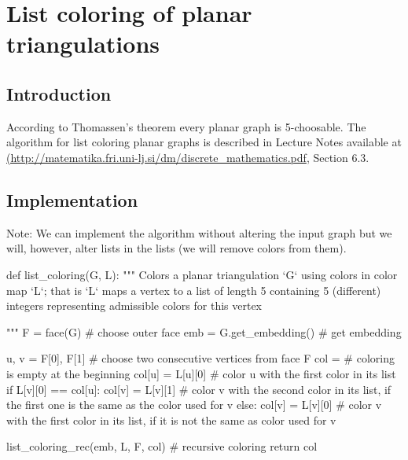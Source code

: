 \chapter{List coloring of planar triangulations}

\section{Introduction}

According to Thomassen's theorem every planar graph is 5-choosable. The algorithm for list coloring planar graphs is described in Lecture Notes available at \url{(http://matematika.fri.uni-lj.si/dm/discrete_mathematics.pdf}, Section 6.3.

\section{Implementation}

Note: We can implement the algorithm without altering the input graph but we will, however, alter lists in the lists (we will remove colors from them).

\begin{sageCell}
def list_coloring(G, L):
    """
    Colors a planar triangulation `G` using colors in color map `L`; that is `L` maps a vertex to a list of length 5 containing
    5 (different) integers representing admissible colors for this vertex

    """
    F = face(G)  # choose outer face
    emb = G.get_embedding()  # get embedding

    u, v = F[0], F[1]  # choose two consecutive vertices from face F
    col = {}  # coloring is empty at the beginning
    col[u] = L[u][0]  # color u with the first color in its list
    if L[v][0] == col[u]:
        col[v] = L[v][1]  # color v with the second color in its list, if the first one is the same as the color used for v
    else:
        col[v] = L[v][0]  # color v with the first color in its list, if it is not the same as color used for v

    list_coloring_rec(emb, L, F, col)  # recursive coloring
    return col
\end{sageCell}

